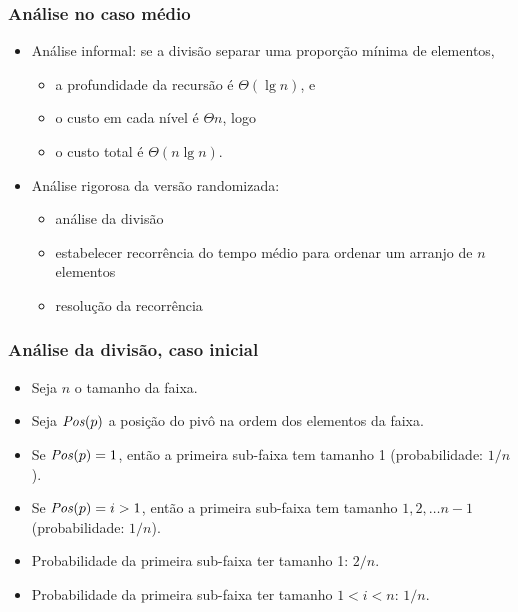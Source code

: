 \documentclass{beamer}
\begin{document}
\begin{frame}

  \frametitle{Análise no caso médio}

  \begin{itemize}

    \item Análise informal: se a divisão separar uma proporção mínima de
      elementos,
      \begin{itemize}
        \item a profundidade da recursão é $\Theta(\lg n)$, e
        \item o custo em cada nível é $\Theta n$, logo
        \item o custo total é $\Theta(n \lg n)$.
      \end{itemize}

    \item Análise rigorosa da versão randomizada:

      \begin{itemize}

        \item análise da divisão

        \item estabelecer recorrência do tempo médio para ordenar um
          arranjo de $n$ elementos

        \item resolução da recorrência

      \end{itemize}

  \end{itemize}

\end{frame}

\begin{frame}

  \frametitle{Análise da divisão, caso inicial}

  \begin{itemize}

    \item Seja $n$ o tamanho da faixa.

    \item Seja $\id{Pos}(p)$ a posição do pivô na ordem dos elementos da faixa.

    \item Se $\id{Pos}(p) = 1$, então a primeira sub-faixa tem tamanho 1 (\alert{probabilidade: $1/n$}).

    \item Se $\id{Pos}(p) = i > 1$, então a primeira sub-faixa tem tamanho
      $1, 2, \ldots n-1$ (\alert{probabilidade: $1/n$}).

    \item Probabilidade da primeira sub-faixa ter tamanho 1: $2/n$.

    \item Probabilidade da primeira sub-faixa ter tamanho $1 < i < n$: $1/n$.

  \end{itemize}

\end{frame}
\end{document}
